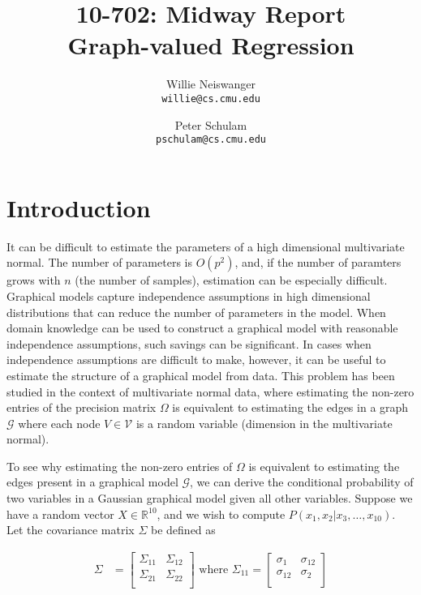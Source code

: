 \documentclass[12pt]{article}
\title{10-702: Midway Report\\
Graph-valued Regression}
\author{Willie Neiswanger\\
\texttt{willie@cs.cmu.edu}
\and
Peter Schulam\\
\texttt{pschulam@cs.cmu.edu}}
\begin{document}
\maketitle

\section{Introduction}
\label{sec:introduction}

It can be difficult to estimate the parameters of a high dimensional multivariate normal. The number of parameters is $O(p^2)$, and, if the number of paramters grows with $n$ (the number of samples), estimation can be especially difficult. Graphical models capture independence assumptions in high dimensional distributions that can reduce the number of parameters in the model. When domain knowledge can be used to construct a graphical model with reasonable independence assumptions, such savings can be significant. In cases when independence assumptions are difficult to make, however, it can be useful to estimate the structure of a graphical model from data. This problem has been studied in the context of multivariate normal data, where estimating the non-zero entries of the precision matrix $\Omega$ is equivalent to estimating the edges in a graph $\mathcal{G}$ where each node $V \in \mathcal{V}$ is a random variable (dimension in the multivariate normal).

To see why estimating the non-zero entries of $\Omega$ is equivalent to estimating the edges present in a graphical model $\mathcal{G}$, we can derive the conditional probability of two variables in a Gaussian graphical model given all other variables. Suppose we have a random vector $X \in \mathbb{R}^{10}$, and we wish to compute $P(x_1, x_2 | x_3, \ldots, x_{10})$. Let the covariance matrix $\Sigma$ be defined as

\begin{align}
    \Sigma &= \begin{bmatrix}
        \Sigma_{11} & \Sigma_{12} \\
        \Sigma_{21} & \Sigma_{22} \\
    \end{bmatrix}
    \text{ where }
    \Sigma_{11} = \begin{bmatrix}
        \sigma_{1} & \sigma_{12} \\
        \sigma_{12} & \sigma_{2} \\
    \end{bmatrix}
\end{align}
\end{document}
